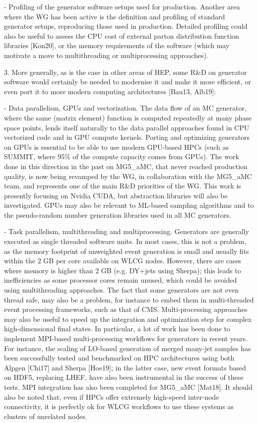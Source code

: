 \documentclass[11pt,a4paper]{article}
\begin{document}
- {Profiling of the generator software setups used for production}.
Another area where the WG has been active is the definition and
profiling of standard generator setups, reproducing those used in
production. Detailed profiling could also be useful to assess the CPU
cost of external parton distribution function libraries {[}Kon20{]}, or
the memory requirements of the software (which may motivate a move to
multithreading or multiprocessing approaches).

3. More generally, as is the case in other areas of HEP, some R\&D on
generator software would certainly be needed to modernise it and make it
more efficient, or even port it to more modern computing architectures
{[}Bau13, Alb19{]}:

- {Data parallelism, GPUs and vectorization}. The data flow of an MC
generator, where the same (matrix element) function is computed
repeatedly at many phase space points, lends itself naturally to the
data parallel approaches found in CPU vectorized code and in GPU compute
kernels. Porting and optimizing generators on GPUs is essential to be
able to use modern GPU-based HPCs (such as SUMMIT, where 95\% of the
compute capacity comes from GPUs). The work done in this direction in
the past on MG5\_aMC, that never reached production quality, is now
being revamped by the WG, in collaboration with the MG5\_aMC team, and
represents one of the main R\&D priorities of the WG. This work is
presently focusing on Nvidia CUDA, but abstraction libraries will also
be investigated. GPUs may also be relevant to ML-based sampling
algorithms and to the pseudo-random number generation libraries used in
all MC generators.

- {Task parallelism, multithreading and multiprocessing}. Generators are
generally executed as single threaded software units. In most cases,
this is not a problem, as the memory footprint of unweighted event
generation is small and usually fits within the 2 GB per core available
on WLCG nodes. However, there are cases where memory is higher than 2 GB
(e.g. DY+jets using Sherpa); this leads to inefficiencies as some
processor cores remain unused, which could be avoided using
multithreading approaches. The fact that some generators are not even
thread safe, may also be a problem, for instance to embed them in
multi-threaded event processing frameworks, such as that of CMS.
Multi-processing approaches may also be useful to speed up the
integration and optimization step for complex high-dimensional final
states. In particular, a lot of work has been done to implement
MPI-based multi-processing workflows for generators in recent years. For
instance, the scaling of LO-based generation of merged many-jet samples
has been successfully tested and benchmarked on HPC architectures using
both Alpgen {[}Chi17{]} and Sherpa {[}Hoe19{]}; in the latter case, new
event formats based on HDF5, replacing LHEF, have also been instrumental
in the success of these tests. MPI integration has also been completed
for MG5\_aMC {[}Mat18{]}. It should also be noted that, even if HPCs
offer extremely high-speed inter-node connectivity, it is perfectly ok
for WLCG workflows to use these systems as clusters of unrelated nodes.
\end{document}
